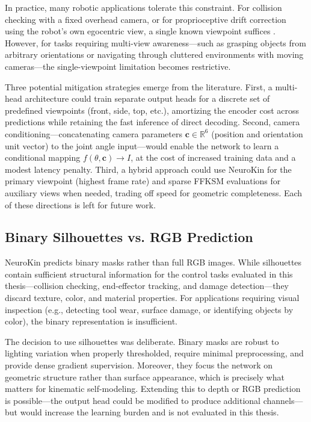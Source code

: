 \documentclass[12pt,a4paper,oneside]{report}
\begin{document}
In practice, many robotic applications tolerate this constraint. For collision checking with a fixed overhead camera, or for proprioceptive drift correction using the robot's own egocentric view, a single known viewpoint suffices \cite{hu2024teaching, chen2022full}. However, for tasks requiring multi-view awareness---such as grasping objects from arbitrary orientations or navigating through cluttered environments with moving cameras---the single-viewpoint limitation becomes restrictive.

Three potential mitigation strategies emerge from the literature. First, a multi-head architecture could train separate output heads for a discrete set of predefined viewpoints (front, side, top, etc.), amortizing the encoder cost across predictions while retaining the fast inference of direct decoding. Second, camera conditioning---concatenating camera parameters $\mathbf{c} \in \mathbb{R}^6$ (position and orientation unit vector) to the joint angle input---would enable the network to learn a conditional mapping $f(\theta, \mathbf{c}) \rightarrow I$, at the cost of increased training data and a modest latency penalty. Third, a hybrid approach could use NeuroKin for the primary viewpoint (highest frame rate) and sparse FFKSM evaluations for auxiliary views when needed, trading off speed for geometric completeness. Each of these directions is left for future work.
\subsection{Binary Silhouettes vs. RGB Prediction}
\label{subsec:binary_silhouettes_vs_rgb_prediction_main}

NeuroKin predicts binary masks rather than full RGB images. While silhouettes contain sufficient structural information for the control tasks evaluated in this thesis---collision checking, end-effector tracking, and damage detection---they discard texture, color, and material properties. For applications requiring visual inspection (e.g., detecting tool wear, surface damage, or identifying objects by color), the binary representation is insufficient.

The decision to use silhouettes was deliberate. Binary masks are robust to lighting variation when properly thresholded, require minimal preprocessing, and provide dense gradient supervision. Moreover, they focus the network on geometric structure rather than surface appearance, which is precisely what matters for kinematic self-modeling. Extending this to depth or RGB prediction is possible---the output head could be modified to produce additional channels---but would increase the learning burden and is not evaluated in this thesis.
\end{document}
